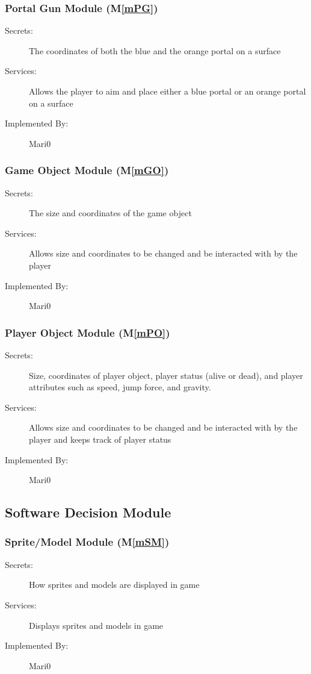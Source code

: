 \documentclass[12pt, titlepage]{article}
\newcommand{\mref}[1]{M\ref{#1}}
\begin{document}
\subsubsection{Portal Gun Module (\mref{mPG})}
\begin{description}
\item[Secrets:] The coordinates of both the blue and the orange portal on a surface
\item[Services:] Allows the player to aim and place either a blue portal or an orange portal on a surface
\item[Implemented By:] Mari0
\end{description}

\subsubsection{Game Object Module (\mref{mGO})}
\begin{description}
\item[Secrets: ]The size and coordinates of the game object
\item[Services:]Allows size and coordinates to be changed and be interacted with by the player
\item[Implemented By:] Mari0
\end{description}

\subsubsection{Player Object Module (\mref{mPO})}
\begin{description}
\item[Secrets:]Size, coordinates of player object, player status (alive or dead), and player attributes such as speed, jump force, and gravity.
\item[Services:]Allows size and coordinates to be changed and be interacted with by the player and keeps track of player status
\item[Implemented By:] Mari0
\end{description}

\subsection{Software Decision Module}

\subsubsection{Sprite/Model Module (\mref{mSM})}
\begin{description}
\item[Secrets:]How sprites and models are displayed in game
\item[Services:]Displays sprites and models in game
\item[Implemented By:] Mari0
\end{description}
\end{document}
